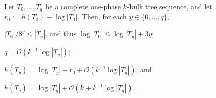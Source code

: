 \documentclass[10pt, conference, compsocconf]{IEEEtran}
\newcommand{\Oh}{\mathcal{O}}
\let\le\leqslant
\let\ge\geqslant
\begin{document}
\begin{lem}
Let $T_0,\dots,T_{q}$ be a complete one-phase $k$-bulk tree sequence,
and let $r_0 := h(T_0)-\log|T_0|$.  Then, for each $y\in\{0,\dots,q\}$,
\begin{compactenum}[(i)]
\item $ |T_0|/8^y\le |T_y|$, and thus $\log|T_0| \le \log|T_y| + 3y$;\label{height-diff}
  \item $q=\Oh(k^{-1}\log|T_y|)$; \label{ystar-bound}
    \item $h(T_y) = \log|T_y| + r_0+\Oh(k^{-1}\log|T_y|) $; and
    \label{bulktree-height-item-i}
    \item $h(T_{q}) = \log|T_{q}|+\Oh(k+k^{-1}\log|T_{q}|)$.\label{bulktree-height-item-ii}
  \end{compactenum}
\end{lem}
\end{document}
